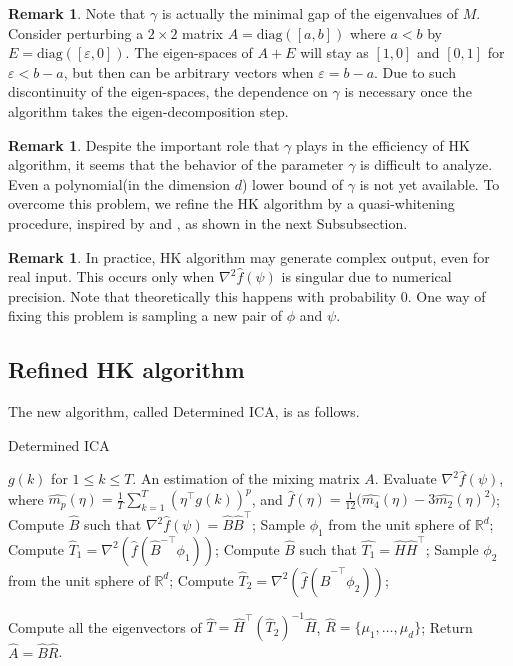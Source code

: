 \documentclass[twoside]{article}
\newcommand{\real}{\mathbb{R}}
\theoremstyle{definition}
\newtheorem{remark}[lemma]{Remark}
\newcommand{\eps}{\varepsilon}
\begin{document}
\begin{remark}
Note that $\gamma$ is actually the minimal gap of the eigenvalues of $M$.
Consider perturbing a $2\times 2$ matrix $A = \text{diag}([a,b])$ where $a<b$ by $E = \text{diag}([\eps,0])$. 
The eigen-spaces of $A+E$ will stay as $[1,0]$ and $[0,1]$ for $\eps < b-a$, but then can be arbitrary vectors when $\eps = b-a$.  
Due to such discontinuity of the eigen-spaces, the dependence on $\gamma$ is necessary once the algorithm takes the eigen-decomposition step. 
\end{remark}
\begin{remark}
Despite the important role that $\gamma$ plays in the efficiency of HK algorithm, it seems that the behavior of the parameter $\gamma$ is difficult to analyze. Even a polynomial(in the dimension $d$) lower bound of $\gamma$ is not yet available. 
To overcome this problem, we refine the HK algorithm by a quasi-whitening procedure, inspired by \citep{arora2012provable} and \citep{frieze1996learning}, as shown in the next Subsubsection.
\end{remark}
\begin{remark}
In practice, HK algorithm may generate complex output, even for real input. This occurs only when $\nabla^2\widehat{f}(\psi)$ is singular due to numerical precision. Note that theoretically this happens with probability 0. One way of fixing this problem is sampling a new pair of $\phi$ and $\psi$.
\end{remark}

\subsection{Refined HK algorithm}
\label{subsec:DICA}
The new algorithm, called Determined ICA, is as follows. 
\begin{algorithm}[H]
\caption{Determined ICA}
\begin{algorithmic}[1]
\INPUT $g(k)$ for $1\le k \le T$. 
\OUTPUT An estimation of the mixing matrix $A$. 
\STATE Evaluate $\nabla^2\widehat{f}(\psi)$, \\
\quad where $\widehat{m_p}(\eta) = \frac{1}{T}\sum_{k=1}^{T} (\eta^{\top}g(k))^p$, and $\widehat{f}(\eta) = \frac{1}{12}\big(\widehat{m_4}(\eta) - 3\widehat{m_2}(\eta)^2 \big)$;
\STATE Compute $\widehat{B}$ such that $\nabla^2\widehat{f}(\psi) = \widehat{B}\widehat{B}^{\top}$;
\STATE Sample $\phi_1$ from the unit sphere of $\real^d$;
\STATE Compute $\widehat{T}_1 = \nabla^2 (\widehat{f}(\widehat{B}^{-\top}\phi_1))$;
\STATE Compute $\widehat{B}$ such that $\widehat{T_1} = \widehat{H}\widehat{H}^{\top}$;
\STATE Sample $\phi_2$ from the unit sphere of $\real^d$;
\STATE Compute $\widehat{T}_2 =\nabla^2 (\widehat{f}(\widehat{B}^{-\top}\phi_2))$;

\STATE Compute all the eigenvectors of $\widehat{T} = \widehat{H}^{\top}\left(\widehat{T}_2\right)^{-1}\widehat{H}$, $\widehat{R} = \{\mu_1,\ldots,\mu_d\}$;
\STATE Return $\widehat{A} = \widehat{B}\widehat{R}$.
\end{algorithmic}
\end{algorithm}
\end{document}
